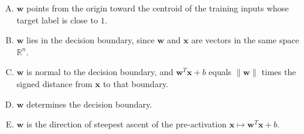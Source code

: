 \documentclass[12pt]{amsart}
\newcommand{\norm}[1]{\|#1\|}
\begin{document}
\begin{enumerate}[(A)]
\item $\mathbf{w}$ points from the origin toward the centroid of the training inputs whose target label is close to $1$.
\item $\mathbf{w}$ lies in the decision boundary, since $\mathbf{w}$ and $\mathbf{x}$ are vectors in the same space $\mathbb{R}^n$.
\item $\mathbf{w}$ is normal to the decision boundary, and $\mathbf{w}^T \mathbf{x} + b$ equals $\norm{\mathbf{w}}$ times the signed distance from $\mathbf{x}$ to that boundary.
\item $\mathbf{w}$ determines the decision boundary.
\item $\mathbf{w}$ is the direction of steepest ascent of the pre-activation $\mathbf{x} \mapsto \mathbf{w}^T \mathbf{x} + b$.
\end{enumerate}
\end{document}
